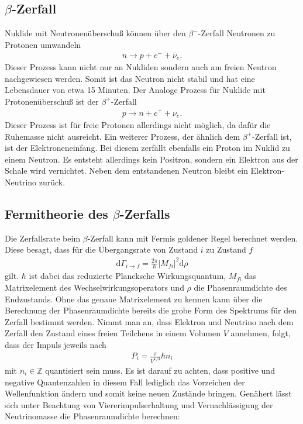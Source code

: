 \subsection{$\beta$-Zerfall}
Nuklide mit Neutronenüberschuß können über den $\beta^-$-Zerfall Neutronen zu Protonen umwandeln
\begin{align*}
  n \rightarrow p + e^- + \bar{\nu}_e.
\end{align*}
Dieser Prozess kann nicht nur an Nukliden sondern auch am freien Neutron nachgewiesen werden. Somit ist das Neutron nicht stabil und hat eine Lebensdauer von etwa 15 Minuten\cite{Agashe:2014kda}.
Der Analoge Prozess für Nuklide mit Protonenüberschuß ist der $\beta^+$-Zerfall
\begin{align*}
  p \rightarrow n + e^+ + \nu_e.
\end{align*}
Dieser Prozess ist für freie Protonen allerdings nicht möglich, da dafür die Ruhemasse nicht ausreicht. 
Ein weiterer Prozess, der ähnlich dem $\beta^+$-Zerfall ist, ist der Elektroneneinfang. Bei diesem zerfällt ebenfalls ein Proton im Nuklid zu einem Neutron. Es entsteht allerdings kein Positron, sondern ein Elektron aus der Schale wird vernichtet. Neben dem entstandenen Neutron bleibt ein Elektron-Neutrino zurück.

\subsection{Fermitheorie des $\beta$-Zerfalls}    
Die Zerfallsrate beim $\beta$-Zerfall kann mit Fermis goldener Regel berechnet werden. Diese besagt, dass für die Übergangsrate von Zustand $i$ zu Zustand $f$
\begin{align*}
  \mathrm{d}\Gamma_{i \rightarrow f}=\frac{2\pi}{\hbar}| M_{fi} |^2 \mathrm{d} \rho
\end{align*}
gilt\cite{Zhang:2016nxa}. $\hbar$ ist dabei das reduzierte Plancksche Wirkungsquantum, $M_{fi}$ das Matrixelement des Wechselwirkungsoperators und $\rho$ die Phasenraumdichte des Endzustands. Ohne das genaue Matrixelement zu kennen kann über die Berechnung der Phasenraumdichte bereits die grobe Form des Spektrums für den Zerfall bestimmt werden. Nimmt man an, dass Elektron und Neutrino nach dem Zerfall den Zustand eines freien Teilchens in einem Volumen $V$ annehmen, folgt, dass der Impuls jeweils nach 
\begin{align*}
  P_i=\frac{\pi}{V^{1/3}}\hbar n_i
\end{align*}
mit $n_i \in \mathbb{Z}$ quantisiert sein muss. Es ist darauf zu achten, dass positive und negative Quantenzahlen in diesem Fall lediglich das Vorzeichen der Wellenfunktion ändern und somit keine neuen Zustände bringen. Genähert lässt sich unter Beachtung von Viererimpulserhaltung und Vernachlässigung der Neutrinomasse die Phasenraumdichte berechnen:

